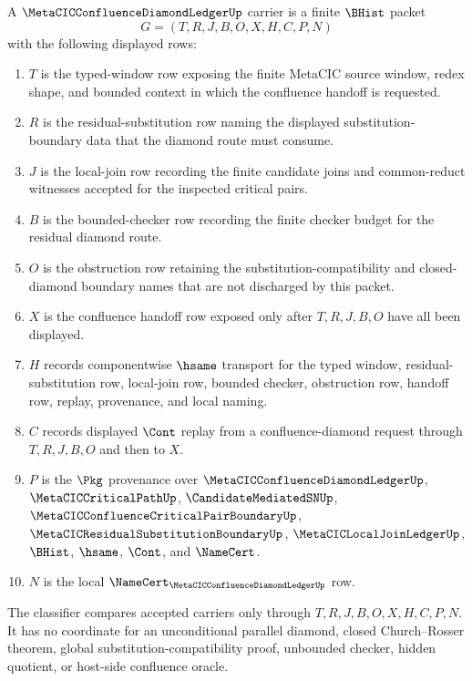 \begin{definition}
\label{def:metacic-confluence-diamond-ledger-carrier}
A $\MetaCICConfluenceDiamondLedgerUp$ carrier is a finite $\BHist$ packet
$$
G=(T,R,J,B,O,X,H,C,P,N)
$$
with the following displayed rows:
\begin{enumerate}
\item $T$ is the typed-window row exposing the finite MetaCIC source window, redex shape, and bounded context in which the confluence handoff is requested.
\item $R$ is the residual-substitution row naming the displayed substitution-boundary data that the diamond route must consume.
\item $J$ is the local-join row recording the finite candidate joins and common-reduct witnesses accepted for the inspected critical pairs.
\item $B$ is the bounded-checker row recording the finite checker budget for the residual diamond route.
\item $O$ is the obstruction row retaining the substitution-compatibility and closed-diamond boundary names that are not discharged by this packet.
\item $X$ is the confluence handoff row exposed only after $T,R,J,B,O$ have all been displayed.
\item $H$ records componentwise $\hsame$ transport for the typed window, residual-substitution row, local-join row, bounded checker, obstruction row, handoff row, replay, provenance, and local naming.
\item $C$ records displayed $\Cont$ replay from a confluence-diamond request through $T,R,J,B,O$ and then to $X$.
\item $P$ is the $\Pkg$ provenance over $\MetaCICConfluenceDiamondLedgerUp$, $\MetaCICCriticalPathUp$, $\CandidateMediatedSNUp$, $\MetaCICConfluenceCriticalPairBoundaryUp$, $\MetaCICResidualSubstitutionBoundaryUp$, $\MetaCICLocalJoinLedgerUp$, $\BHist$, $\hsame$, $\Cont$, and $\NameCert$.
\item $N$ is the local $\NameCert_{\MetaCICConfluenceDiamondLedgerUp}$ row.
\end{enumerate}
The classifier compares accepted carriers only through $T,R,J,B,O,X,H,C,P,N$. It has no coordinate for an unconditional parallel diamond, closed Church--Rosser theorem, global substitution-compatibility proof, unbounded checker, hidden quotient, or host-side confluence oracle.
\end{definition}


